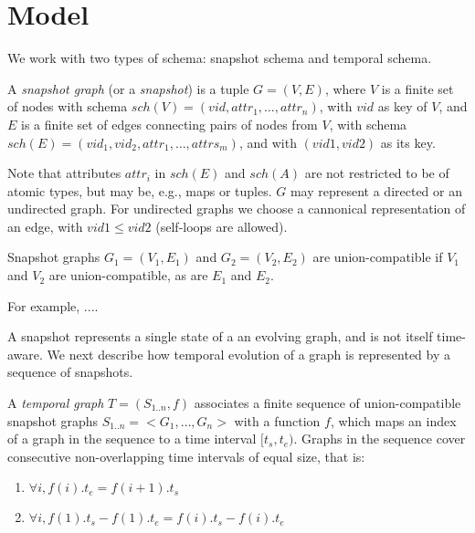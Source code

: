 \section{Model}
\label{sec:model}


We work with two types of schema: snapshot schema and temporal schema.

\begin{definition}
\label{def:sg}
A {\em snapshot graph} (or a {\em snapshot}) is a tuple $G = (V,E)$,
where $V$ is a finite set of nodes with schema $sch(V)=(vid, attr_1,
\ldots, attr_n)$, with $vid$ as key of $V$, and $E$ is a finite set of
edges connecting pairs of nodes from $V$, with schema $sch(E)=(vid_1,
vid_2, attr_1, \ldots, attrs_m)$, and with $(vid1,vid2)$ as its key.
\end{definition}

Note that attributes $attr_i$ in $sch(E)$ and $sch(A)$ are not
restricted to be of atomic types, but may be, e.g., maps or tuples.
$G$ may represent a directed or an undirected graph.  For undirected
graphs we choose a cannonical representation of an edge, with $vid1
\leq vid2$ (self-loops are allowed).

Snapshot graphs $G_1 = (V_1, E_1)$ and $G_2 = (V_2, E_2)$ are
union-compatible if $V_1$ and $V_2$ are union-compatible, as are $E_1$
and $E_2$.

For example, ....

A snapshot represents a single state of a an evolving graph, and is
not itself time-aware.  We next describe how temporal evolution of a
graph is represented by a sequence of snapshots.

\begin{definition}
\label{def:tg}
A {\em temporal graph} $T = (S_{1..n}, f)$ associates a finite
sequence of union-compatible snapshot graphs $S_{1..n} = <G_1, \ldots,
G_n>$ with a function $f$, which maps an index of a graph in the
sequence to a time interval $[t_s, t_e)$.  Graphs in the sequence
  cover consecutive non-overlapping time intervals of equal size, that
  is:

\begin{enumerate}
\item $\forall i, f(i).t_e = f(i+1).t_s$
\item $\forall i, f(1).t_s - f(1).t_e = f(i).t_s - f(i).t_e$  
\end{enumerate}
\end{definition}

